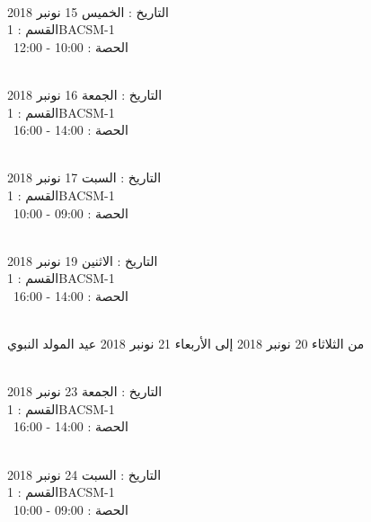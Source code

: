 \documentclass[14pt a4paper twocolumn]{book}
\begin{document}
\par
\noindent\makebox[\linewidth]{\rule{\paperwidth}{0.4pt}}
 \\
التاريخ : الخميس 15 نونبر 2018 \\
القسم : 1BACSM-1 \\
 \  
الحصة : 10:00 - 12:00 \\
\par
\noindent\makebox[\linewidth]{\rule{\paperwidth}{0.4pt}}
 \\
التاريخ : الجمعة 16 نونبر 2018 \\
القسم : 1BACSM-1 \\
 \  
الحصة : 14:00 - 16:00 \\
\par
\noindent\makebox[\linewidth]{\rule{\paperwidth}{0.4pt}}
 \\
التاريخ : السبت 17 نونبر 2018 \\
القسم : 1BACSM-1 \\
 \  
الحصة : 09:00 - 10:00 \\
\par
\noindent\makebox[\linewidth]{\rule{\paperwidth}{0.4pt}}
 \\
التاريخ : الاثنين 19 نونبر 2018 \\
القسم : 1BACSM-1 \\
 \  
الحصة : 14:00 - 16:00 \\
\par
\noindent\makebox[\linewidth]{\rule{\paperwidth}{0.4pt}}
 \\
من الثلاثاء 20 نونبر 2018 إلى الأربعاء 21 نونبر 2018
\newline
\indent
  عيد المولد النبوي
\par
\noindent\makebox[\linewidth]{\rule{\paperwidth}{0.4pt}}
 \\
التاريخ : الجمعة 23 نونبر 2018 \\
القسم : 1BACSM-1 \\
 \  
الحصة : 14:00 - 16:00 \\
\par
\noindent\makebox[\linewidth]{\rule{\paperwidth}{0.4pt}}
 \\
التاريخ : السبت 24 نونبر 2018 \\
القسم : 1BACSM-1 \\
 \  
الحصة : 09:00 - 10:00 \\
\end{document}
